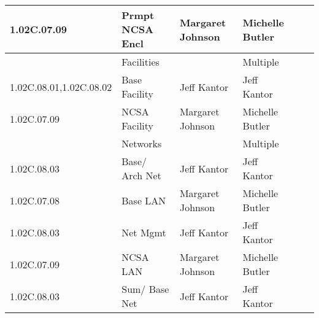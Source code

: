 \begin{longtable}{|p{}|p{}|p{}|p{}|p{}|p{}|}
1.02C.07.09 &  Prmpt NCSA Encl & Margaret Johnson & Michelle Butler & \\ \hline
 &  Facilities &  & Multiple & \\ \hline
1.02C.08.01,1.02C.08.02 &  Base Facility & Jeff Kantor & Jeff Kantor & \\ \hline
1.02C.07.09 &  NCSA Facility & Margaret Johnson & Michelle Butler & \\ \hline
 &  Networks &  & Multiple & \\ \hline
1.02C.08.03 &  Base/ Arch Net & Jeff Kantor & Jeff Kantor & \\ \hline
1.02C.07.08 &  Base LAN & Margaret Johnson & Michelle Butler & \\ \hline
1.02C.08.03 &  Net Mgmt & Jeff Kantor & Jeff Kantor & \\ \hline
1.02C.07.09 &  NCSA LAN & Margaret Johnson & Michelle Butler & \\ \hline
1.02C.08.03 &  Sum/ Base Net & Jeff Kantor & Jeff Kantor & \\ \hline
\end{longtable}
\normalsize
